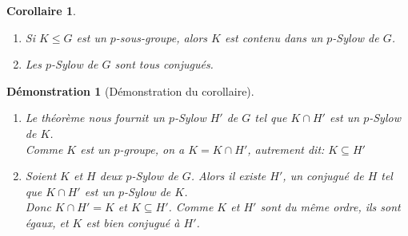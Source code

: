 \documentclass[a4paper, oneside]{report}
\theoremstyle{break}
\newtheorem{corollaire}[thm]{Corollaire}
\newtheorem*{demonstration}{Démonstration}
\begin{document}
\begin{corollaire}
\begin{enumerate}
\item  Si $K \leq G$ est un $p$-sous-groupe, alors $K$ est contenu dans un $p$-Sylow de $G$.

\medbreak

\item  Les $p$-Sylow de $G$ sont tous conjugués.

\end{enumerate}
\end{corollaire}

\begin{demonstration}[Démonstration du corollaire]
\begin{enumerate}
\item  Le théorème nous fournit un $p$-Sylow $H'$ de $G$ tel que $K \cap H'$ est un $p$-Sylow de $K$.\\
Comme $K$ est un $p$-groupe, on a $K = K \cap H'$, autrement dit: $K \subseteq H'$

\medbreak

\item  Soient $K$ et $H$ deux $p$-Sylow de $G$. Alors il existe $H'$, un conjugué de $H$ tel que $K \cap H'$ est un $p$-Sylow de $K$.\\
Donc $K \cap H' = K$ et $K \subseteq H'$. Comme $K$ et $H'$ sont du même ordre, ils sont égaux, et $K$ est bien conjugué à $H'$.

\end{enumerate}
\end{demonstration}
\end{document}
